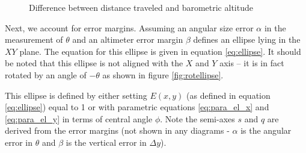 \documentclass{IEEEtran}
\begin{document}
\begin{figure}[h]
\begin{centering}
\caption{Difference between distance traveled and barometric altitude}
\label{fig:altdiff}
\end{centering}
\end{figure}

Next, we account for error margins.  Assuming an angular size error $\alpha$
in the measurement of $\theta$ and an altimeter error margin $\beta$ defines an
ellipse lying in the $XY$ plane.  The equation for this ellipse is given
in equation \ref{eq:ellipse}.  It should be noted that this ellipse is not
aligned with the $X$ and $Y$ axis -- it is in fact rotated by an angle of
$-\theta$ as shown in figure \ref{fig:rotellipse}.  

This ellipse is defined by
either setting $E(x,y)$ (as defined in equation \ref{eq:ellipse}) equal to 1
or with parametric equations \ref{eq:para_el_x} and \ref{eq:para_el_y} in terms
of central angle $\phi$.  Note the semi-axes $s$ and $q$ are derived from the
error margins (not shown in any diagrams - $\alpha$ is the angular error in
$\theta$ and $\beta$ is the vertical error in $\Delta y$).
\end{document}

